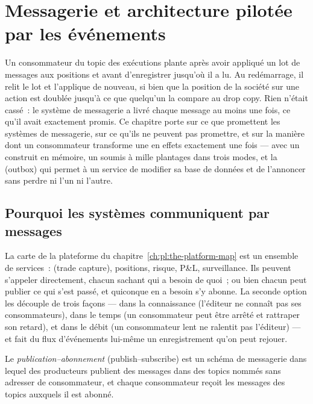 \chapter{Messagerie et architecture pilotée par les événements}\label{ch:pl:messaging-and-event-driven-architecture}

Un consommateur du topic des exécutions plante après avoir appliqué un lot de messages aux positions et avant d'enregistrer jusqu'où il a lu. Au
redémarrage, il relit le lot et l'applique de nouveau, si bien que la position de la société sur une action est doublée jusqu'à ce que quelqu'un la compare au
drop copy. Rien n'était cassé~: le système de messagerie a livré chaque message au moins une fois, ce qu'il avait exactement promis. Ce chapitre
porte sur ce que promettent les systèmes de messagerie, sur ce qu'ils ne peuvent pas promettre, et sur la manière dont un consommateur transforme une  en effets exactement une fois --- avec un
 construit en mémoire, un  soumis à mille plantages dans trois modes, et la  (outbox) qui permet à un service de modifier
sa base de données et de l'annoncer sans perdre ni l'un ni l'autre.

\section{Pourquoi les systèmes communiquent par messages}

La carte de la plateforme du chapitre~\ref{ch:pl:the-platform-map} est un ensemble de services~:  (trade capture), positions, risque, P\&L, surveillance. Ils peuvent
s'appeler directement, chacun sachant qui a besoin de quoi~; ou bien chacun peut publier ce qui s'est passé, et quiconque en a besoin s'y abonne. La seconde
option les découple de trois façons --- dans la connaissance (l'éditeur ne connaît pas ses consommateurs), dans le temps (un consommateur peut être arrêté et rattraper son retard), et
dans le débit (un consommateur lent ne ralentit pas l'éditeur) --- et fait du flux d'événements lui-même un enregistrement qu'on peut rejouer.

\begin{definition}\label{def:pl:messaging-and-event-driven-architecture:pubsub}
Le \emph{publication--abonnement} (publish--subscribe) est un schéma de messagerie dans lequel des producteurs publient des messages dans des topics nommés sans
adresser de consommateur, et chaque consommateur reçoit les messages des topics auxquels il est abonné.
\end{definition}

